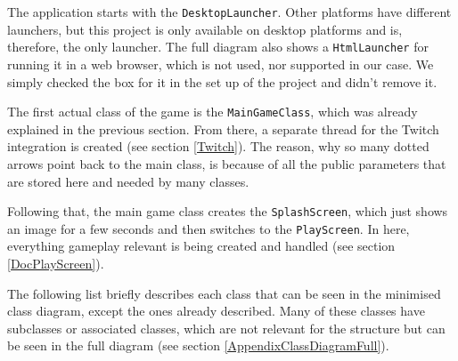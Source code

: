 \documentclass[12p]{article}
\begin{document}
The application starts with the \texttt{DesktopLauncher}. Other platforms have different launchers, but this project is only available on desktop platforms and is, therefore, the only launcher. The full diagram also shows a \texttt{HtmlLauncher} for running it in a web browser, which is not used, nor supported in our case. We simply checked the box for it in the set up of the project and didn't remove it.

The first actual class of the game is the \texttt{MainGameClass}, which was already explained in the previous section. From there, a separate thread for the Twitch integration is created (see section \ref{Twitch}). The reason, why so many dotted arrows point back to the main class, is because of all the public parameters that are stored here and needed by many classes.

Following that, the main game class creates the \texttt{SplashScreen}, which just shows an image for a few seconds and then switches to the \texttt{PlayScreen}. In here, everything gameplay relevant is being created and handled (see section \ref{DocPlayScreen}). 

The following list briefly describes each class that can be seen in the minimised class diagram, except the ones already described. Many of these classes have subclasses or associated classes, which are not relevant for the structure but can be seen in the full diagram (see section \ref{AppendixClassDiagramFull}).
\end{document}
